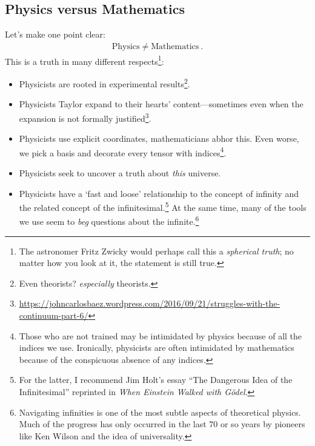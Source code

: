 
\subsection{Physics versus Mathematics}


Let’s make one point clear:
\begin{align}
  \text{Physics} \neq \text{Mathematics} \ .
\end{align}
This is a truth in many different respects\footnote{The astronomer Fritz Zwicky would perhaps call this a \emph{spherical truth}; no matter how you look at it, the statement is still true.}:
\begin{itemize}
	\item Physicists are rooted in experimental results\footnote{Even theorists? \emph{especially} theorists.}. 
	
	\item Physicists Taylor expand to their hearts’ content---sometimes even when the expansion is not formally justified\footnote{\url{https://johncarlosbaez.wordpress.com/2016/09/21/struggles-with-the-continuum-part-6/}}.

	\item Physicists use explicit coordinates, mathematicians abhor this.  Even worse, we pick a basis and decorate every tensor with indices\footnote{Those who are not trained may be intimidated by physics because of all the indices we use. Ironically, physicists are often intimidated by mathematics because of the conspicuous absence of any indices.}.

	\item Physicists seek to uncover a truth about \emph{this} universe.
	\item Physicists have a `fast and loose' relationship to the concept of infinity and the related concept of the infinitesimal.\footnote{For the latter, I recommend Jim Holt's essay ``The Dangerous Idea of the Infinitesimal'' reprinted in \emph{When Einstein Walked with G\"odel}.} At the same time, many of the tools we use seem to \emph{beg} questions about the infinite.\footnote{Navigating infinities is one of the most subtle aspects of theoretical physics. Much of the progress has only occurred in the last 70 or so years by pioneers like Ken Wilson and the idea of universality.}
\end{itemize}


